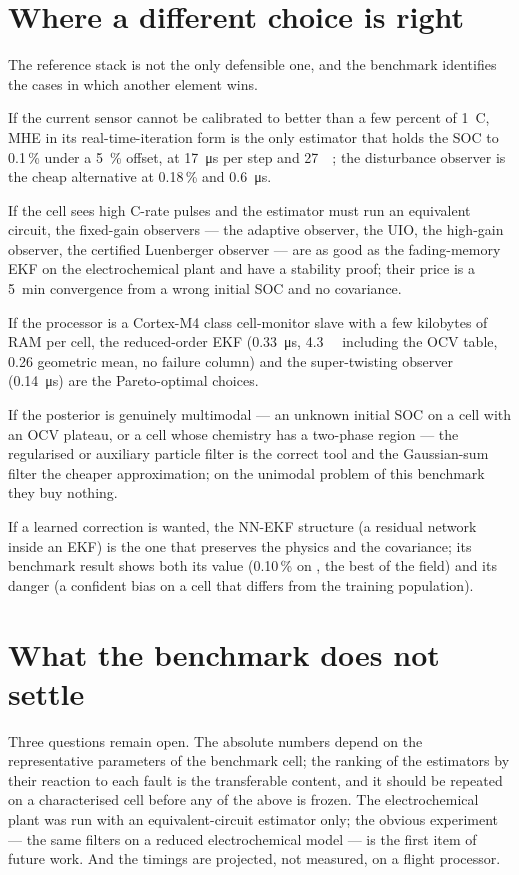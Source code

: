 \section{Where a different choice is right}

The reference stack is not the only defensible one, and the benchmark identifies the cases in
which another element wins.

If the current sensor cannot be calibrated to better than a few percent of \SI{1}{C}, MHE in its
real-time-iteration form is the only estimator that holds the SOC to \num{0.1}\,\% under a
\SI{5}{\percent} offset, at \SI{17}{\micro\second} per step and \SI{27}{\kilo\byte}; the
disturbance observer is the cheap alternative at \num{0.18}\,\% and \SI{0.6}{\micro\second}.

If the cell sees high C-rate pulses and the estimator must run an equivalent circuit, the
fixed-gain observers --- the adaptive observer, the UIO, the high-gain observer, the certified
Luenberger observer --- are as good as the fading-memory EKF on the electrochemical plant and
have a stability proof; their price is a \SI{5}{\minute} convergence from a wrong initial SOC
and no covariance.

If the processor is a Cortex-M4 class cell-monitor slave with a few kilobytes of RAM per cell,
the reduced-order EKF (\SI{0.33}{\micro\second}, \SI{4.3}{\kilo\byte} including the OCV table,
\SI{0.26}{} geometric mean, no failure column) and the super-twisting observer
(\SI{0.14}{\micro\second}) are the Pareto-optimal choices.

If the posterior is genuinely multimodal --- an unknown initial SOC on a cell with an OCV
plateau, or a cell whose chemistry has a two-phase region --- the regularised or auxiliary
particle filter is the correct tool and the Gaussian-sum filter the cheaper approximation; on
the unimodal problem of this benchmark they buy nothing.

If a learned correction is wanted, the NN-EKF structure (a residual network inside an EKF) is
the one that preserves the physics and the covariance; its benchmark result shows both its
value (\num{0.10}\,\% on , the best of the field) and its danger (a confident
bias on a cell that differs from the training population).

\section{What the benchmark does not settle}

Three questions remain open. The absolute numbers depend on the representative parameters of
the benchmark cell; the ranking of the estimators by their reaction to each fault is the
transferable content, and it should be repeated on a characterised cell before any of the
above is frozen. The electrochemical plant was run with an equivalent-circuit estimator only;
the obvious experiment --- the same filters on a reduced electrochemical model --- is the
first item of future work. And the timings are projected, not measured, on a flight processor.
